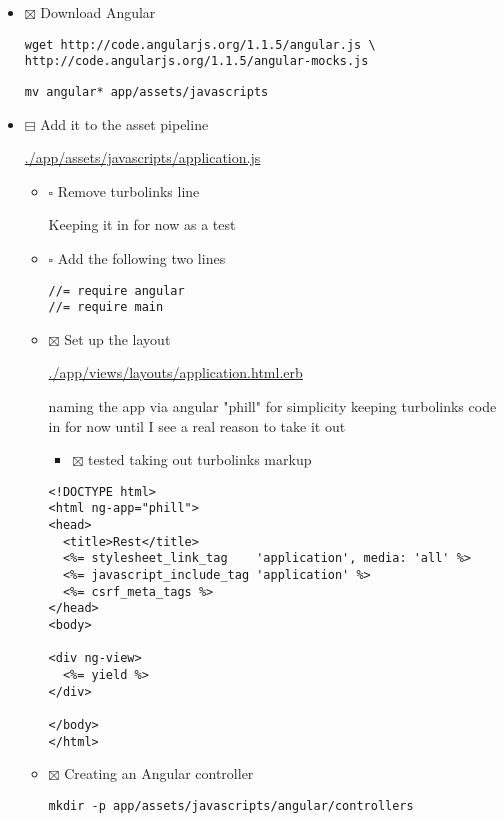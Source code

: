 \documentclass[11pt]{article}
\begin{document}
\begin{itemize}
\begin{itemize}
\begin{itemize}
\item $\boxtimes$ Download Angular

\begin{verbatim}
wget http://code.angularjs.org/1.1.5/angular.js \
http://code.angularjs.org/1.1.5/angular-mocks.js
\end{verbatim}

\begin{verbatim}
mv angular* app/assets/javascripts
\end{verbatim}

\item $\boxminus$ Add it to the asset pipeline

\url{./app/assets/javascripts/application.js}

\begin{itemize}
\item $\square$ Remove turbolinks line

Keeping it in for now as a test

\item $\square$ Add the following two lines

\begin{verbatim}
//= require angular
//= require main
\end{verbatim}

\item $\boxtimes$ Set up the layout

\url{./app/views/layouts/application.html.erb}

naming the app via angular "phill" for simplicity
keeping turbolinks code in for now until I see a real reason to 
take it out

\begin{itemize}
\item $\boxtimes$ tested taking out turbolinks markup
\end{itemize}
\begin{verbatim}
<!DOCTYPE html>
<html ng-app="phill">
<head>
  <title>Rest</title>
  <%= stylesheet_link_tag    'application', media: 'all' %>
  <%= javascript_include_tag 'application' %>
  <%= csrf_meta_tags %>
</head>
<body>

<div ng-view>
  <%= yield %>
</div>

</body>
</html>
\end{verbatim}

\item $\boxtimes$ Creating an Angular controller

\begin{verbatim}
mkdir -p app/assets/javascripts/angular/controllers
\end{verbatim}


\end{itemize}
\end{itemize}
\end{itemize}
\end{itemize}
\end{document}
